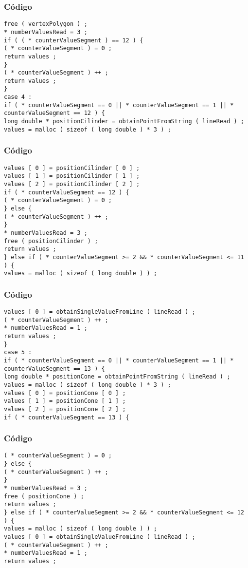 \documentclass{beamer}
\begin{document}
\begin{frame}[fragile]
\frametitle{C\'odigo}
\begin{verbatim}
free ( vertexPolygon ) ; 
* numberValuesRead = 3 ; 
if ( ( * counterValueSegment ) == 12 ) { 
( * counterValueSegment ) = 0 ; 
return values ; 
} 
( * counterValueSegment ) ++ ; 
return values ; 
} 
case 4 : 
if ( * counterValueSegment == 0 || * counterValueSegment == 1 || * counterValueSegment == 12 ) { 
long double * positionCilinder = obtainPointFromString ( lineRead ) ; 
values = malloc ( sizeof ( long double ) * 3 ) ; 
\end{verbatim}
\end{frame}
\begin{frame}[fragile]
\frametitle{C\'odigo}
\begin{verbatim}
values [ 0 ] = positionCilinder [ 0 ] ; 
values [ 1 ] = positionCilinder [ 1 ] ; 
values [ 2 ] = positionCilinder [ 2 ] ; 
if ( * counterValueSegment == 12 ) { 
( * counterValueSegment ) = 0 ; 
} else { 
( * counterValueSegment ) ++ ; 
} 
* numberValuesRead = 3 ; 
free ( positionCilinder ) ; 
return values ; 
} else if ( * counterValueSegment >= 2 && * counterValueSegment <= 11 ) { 
values = malloc ( sizeof ( long double ) ) ; 
\end{verbatim}
\end{frame}
\begin{frame}[fragile]
\frametitle{C\'odigo}
\begin{verbatim}
values [ 0 ] = obtainSingleValueFromLine ( lineRead ) ; 
( * counterValueSegment ) ++ ; 
* numberValuesRead = 1 ; 
return values ; 
} 
case 5 : 
if ( * counterValueSegment == 0 || * counterValueSegment == 1 || * counterValueSegment == 13 ) { 
long double * positionCone = obtainPointFromString ( lineRead ) ; 
values = malloc ( sizeof ( long double ) * 3 ) ; 
values [ 0 ] = positionCone [ 0 ] ; 
values [ 1 ] = positionCone [ 1 ] ; 
values [ 2 ] = positionCone [ 2 ] ; 
if ( * counterValueSegment == 13 ) { 
\end{verbatim}
\end{frame}
\begin{frame}[fragile]
\frametitle{C\'odigo}
\begin{verbatim}
( * counterValueSegment ) = 0 ; 
} else { 
( * counterValueSegment ) ++ ; 
} 
* numberValuesRead = 3 ; 
free ( positionCone ) ; 
return values ; 
} else if ( * counterValueSegment >= 2 && * counterValueSegment <= 12 ) { 
values = malloc ( sizeof ( long double ) ) ; 
values [ 0 ] = obtainSingleValueFromLine ( lineRead ) ; 
( * counterValueSegment ) ++ ; 
* numberValuesRead = 1 ; 
return values ; 
\end{verbatim}
\end{frame}
\end{document}
